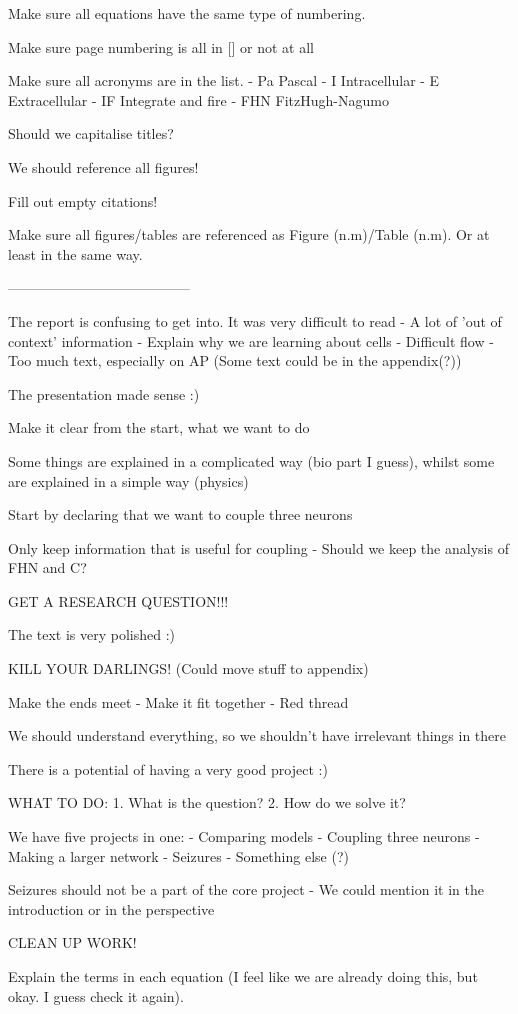 Make sure all equations have the same type of numbering.

Make sure page numbering is all in [] or not at all

Make sure all acronyms are in the list.
    - Pa    Pascal
    - I     Intracellular
    - E     Extracellular
    - IF    Integrate and fire
    - FHN   FitzHugh-Nagumo

Should we capitalise titles?

We should reference all figures!

Fill out empty citations!

Make sure all figures/tables are referenced as Figure (n.m)/Table (n.m). Or at least in the same way.

---------------------------------------

The report is confusing to get into. It was very difficult to read
    - A lot of 'out of context' information
    - Explain why we are learning about cells
    - Difficult flow
    - Too much text, especially on AP (Some text could be in    the appendix(?))

The presentation made sense :)

Make it clear from the start, what we want to do

Some things are explained in a complicated way (bio part I guess), whilst some are explained in a simple way (physics)

Start by declaring that we want to couple three neurons 

Only keep information that is useful for coupling
    - Should we keep the analysis of FHN and C?

GET A RESEARCH QUESTION!!!

The text is very polished :)

KILL YOUR DARLINGS! (Could move stuff to appendix)

Make the ends meet
    - Make it fit together 
    - Red thread

We should understand everything, so we shouldn't have irrelevant things in there

There is a potential of having a very good project :)

WHAT TO DO:
    1. What is the question?
    2. How do we solve it?

We have five projects in one:
    - Comparing models
    - Coupling three neurons
    - Making a larger network
    - Seizures
    - Something else (?)

Seizures should not be a part of the core project
    - We could mention it in the introduction or in the         perspective 

CLEAN UP WORK!

Explain the terms in each equation (I feel like we are already doing this, but okay. I guess check it again).